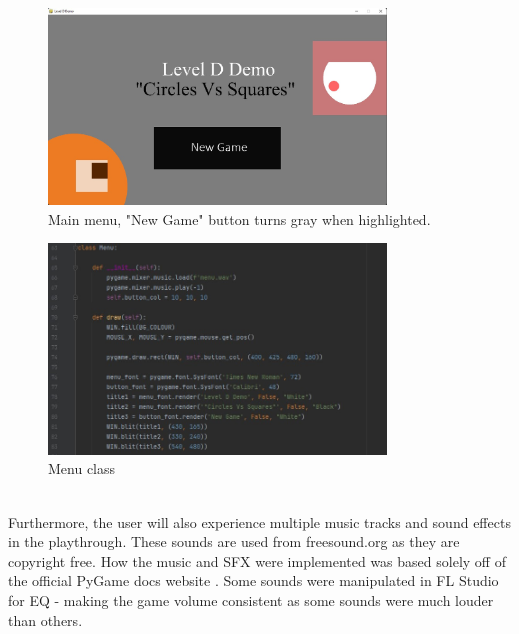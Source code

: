 \documentclass[a4paper, 11pt]{report}
\begin{document}
\begin{figure}[h]
    \centering
    \includegraphics[width=0.8\textwidth]{mainmenu}
    \caption{Main menu, "New Game" button turns gray when highlighted.}
\end{figure}
\begin{figure}[h]
    \centering
    \includegraphics[width=0.8\textwidth]{menu_code}
    \caption{Menu class}
\end{figure}
\\
Furthermore, the user will also experience multiple music tracks and sound effects in the playthrough. These sounds are used from freesound.org \cite{freesound} as they are copyright free. How the music and SFX were implemented was based solely off of the official PyGame docs website \cite{pygame_mixer}. Some sounds were manipulated in FL Studio for EQ - making the game volume consistent as some sounds were much louder than others.
\\\\\\\\\\
\end{document}
